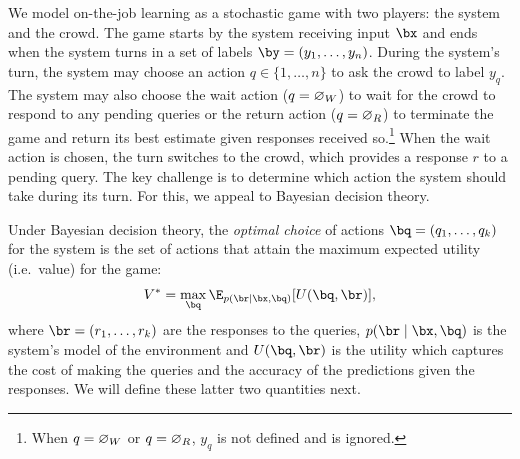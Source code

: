 

We model on-the-job learning as a stochastic game with two players: the system and the crowd.
The game starts by the system receiving input $\bx$ and ends when the system turns in a set of labels $\by = (y_1, \ldots, y_n)$. 
During the system's turn, the system may choose an action $q \in \{1, \ldots, n\}$ to ask the crowd to label $y_q$. 
The system may also choose 
the wait action ($q = \varnothing_{W}$) to wait for the crowd to respond to any pending queries
or
the return action ($q = \varnothing_{R}$) to terminate the game and return its best estimate given responses received so.\footnote{When $q = \varnothing_{W}$ or $q = \varnothing_{R}$, $y_q$ is not defined and is ignored.}
When the wait action is chosen, the turn switches to the crowd, which provides a response $r$ to a pending query.
The key challenge is to determine which action the system should take during its turn.
For this, we appeal to Bayesian decision theory.

Under Bayesian decision theory, the \emph{optimal choice} of actions $\bq = (q_1, \ldots, q_k)$ for the system is the set of actions that attain the maximum expected utility (i.e.\ value) for the game:
\begin{align}
  \label{eqn:value}
V^* = \max_{\bq} \E_{p(\br \mid \bx, \bq)}[U(\bq, \br)],
\end{align}
where $\br = (r_1, \ldots, r_k)$ are the responses to the queries, $p(\br \mid \bx, \bq)$ is the system's model of the environment and $U(\bq, \br)$ is the utility which captures the cost of making the queries and the accuracy of the predictions given the responses. 
We will define these latter two quantities next.


